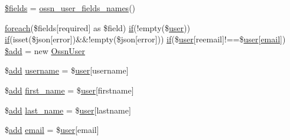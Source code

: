 \begin{DoxyCompactItemize}
\item 
\hyperlink{register_8php_ab2303c817e3b402b77b7f99627b9c319}{\$fields} = \hyperlink{ossn_8lib_8users_8php_a67125cfdd672959bff2d8dbd44034cb0}{ossn\+\_\+user\+\_\+fields\+\_\+names}()
\item 
\hyperlink{user__timeline_8php_a1b18c909b5f0affc85267f294d947c4b}{foreach}(\$fields\mbox{[}\textquotesingle{}required\textquotesingle{}\mbox{]} as \$field) \hyperlink{jquery_8tokeninput_8js_ad8dd46a3cbc004569e34401e9e71771a}{if}(!empty(\$\hyperlink{ossn_8config_8db_8example_8php_a802544b7ba9f79bbf24ef67773d53bed}{user})) \hyperlink{jquery_8tokeninput_8js_ad8dd46a3cbc004569e34401e9e71771a}{if}(isset(\$json\mbox{[}\textquotesingle{}error\textquotesingle{}\mbox{]})\&\&!empty(\$json\mbox{[}\textquotesingle{}error\textquotesingle{}\mbox{]})) \hyperlink{jquery_8tokeninput_8js_ad8dd46a3cbc004569e34401e9e71771a}{if}(\$\hyperlink{ossn_8config_8db_8example_8php_a802544b7ba9f79bbf24ef67773d53bed}{user}\mbox{[}\textquotesingle{}reemail\textquotesingle{}\mbox{]}!==\$\hyperlink{ossn_8config_8db_8example_8php_a802544b7ba9f79bbf24ef67773d53bed}{user}\mbox{[}\textquotesingle{}\hyperlink{actions_2account_8php_a011c66ae212438e0d7de7c0e40451bb3}{email}\textquotesingle{}\mbox{]}) \hyperlink{register_8php_a8a220b45d1ed546b874dde7e0ac4644f}{\$add} = new \hyperlink{class_ossn_user}{Ossn\+User}
\item 
\$\hyperlink{theme_8min_8js_a79ed6f45c867c160601f70dfa5ec2f95}{add} \hyperlink{register_8php_ac9b3768ccc688c2ff0811c50c107a02e}{username} = \$\hyperlink{ossn_8config_8db_8example_8php_a802544b7ba9f79bbf24ef67773d53bed}{user}\mbox{[}\textquotesingle{}username\textquotesingle{}\mbox{]}
\item 
\$\hyperlink{theme_8min_8js_a79ed6f45c867c160601f70dfa5ec2f95}{add} \hyperlink{register_8php_a9a79298edb546fb2a33bc6d266131c04}{first\+\_\+name} = \$\hyperlink{ossn_8config_8db_8example_8php_a802544b7ba9f79bbf24ef67773d53bed}{user}\mbox{[}\textquotesingle{}firstname\textquotesingle{}\mbox{]}
\item 
\$\hyperlink{theme_8min_8js_a79ed6f45c867c160601f70dfa5ec2f95}{add} \hyperlink{register_8php_ad28df3187bc8c49657d3800bb449f939}{last\+\_\+name} = \$\hyperlink{ossn_8config_8db_8example_8php_a802544b7ba9f79bbf24ef67773d53bed}{user}\mbox{[}\textquotesingle{}lastname\textquotesingle{}\mbox{]}
\item 
\$\hyperlink{theme_8min_8js_a79ed6f45c867c160601f70dfa5ec2f95}{add} \hyperlink{register_8php_a011c66ae212438e0d7de7c0e40451bb3}{email} = \$\hyperlink{ossn_8config_8db_8example_8php_a802544b7ba9f79bbf24ef67773d53bed}{user}\mbox{[}\textquotesingle{}email\textquotesingle{}\mbox{]}

\end{DoxyCompactItemize}
